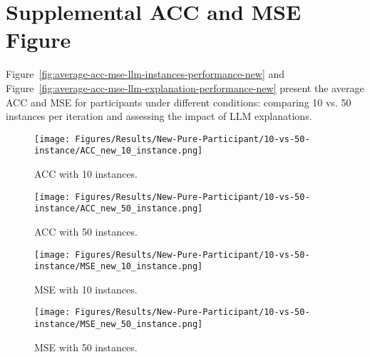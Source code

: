 \section{Supplemental ACC and MSE Figure}
Figure~\ref{fig:average-acc-mse-llm-instances-performance-new} and Figure~\ref{fig:average-acc-mse-llm-explanation-performance-new}  present the average ACC and MSE for participants under different conditions: comparing 10 vs. 50 instances per iteration and assessing the impact of LLM explanations.
\begin{figure*}
    \centering
    \begin{subfigure}{0.48\textwidth}
     \texttt{[image: Figures/Results/New-Pure-Participant/10-vs-50-instance/ACC\_new\_10\_instance.png]}
    \caption{ACC with 10 instances.}
    \label{fig:new-lineplot-acc-10}
  \end{subfigure}
  \hfill
  \begin{subfigure}{0.48\textwidth}
    \texttt{[image: Figures/Results/New-Pure-Participant/10-vs-50-instance/ACC\_new\_50\_instance.png]}
    \caption{ACC with 50 instances.}
    \label{fig:new-lineplot-acc-50}
  \end{subfigure}
  \begin{subfigure}{0.48\textwidth}
     \texttt{[image: Figures/Results/New-Pure-Participant/10-vs-50-instance/MSE\_new\_10\_instance.png]}
    \caption{MSE with 10 instances.}
    \label{fig:new-lineplot-mse-10}
  \end{subfigure}
  \hfill
  \begin{subfigure}{0.48\textwidth}
    \texttt{[image: Figures/Results/New-Pure-Participant/10-vs-50-instance/MSE\_new\_50\_instance.png]}
    \caption{MSE with 50 instances.}
    \label{fig:new-lineplot-mse-50}
  \end{subfigure}
  \caption{The average ACC and MSE for participants reviewing 10 or 50 instances per iteration are presented in four subfigures, comparing ACC and MSE between the two conditions.}
  \label{fig:average-acc-mse-llm-instances-performance-new}
\end{figure*}

